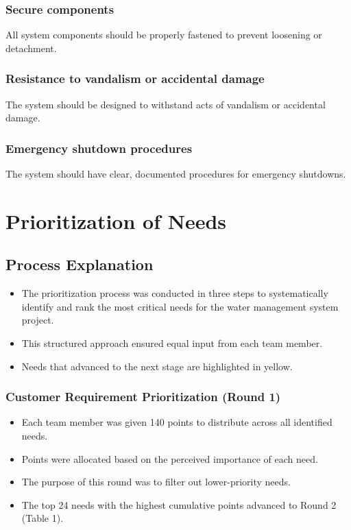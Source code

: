 \documentclass[12pt]{report}
\begin{document}
\subsubsection{Secure components}
All system components should be properly fastened to prevent loosening or detachment.

\subsubsection{Resistance to vandalism or accidental damage}
The system should be designed to withstand acts of vandalism or accidental damage.

\subsubsection{Emergency shutdown procedures}
The system should have clear, documented procedures for emergency shutdowns.

\newpage
\section{Prioritization of Needs}

\subsection{Process Explanation}
\begin{itemize}
    \item The prioritization process was conducted in three steps to systematically identify and rank the most critical needs for the water management system project.
    \item This structured approach ensured equal input from each team member.
    \item Needs that advanced to the next stage are highlighted in yellow.
\end{itemize}

\subsubsection{Customer Requirement Prioritization (Round 1)}
\begin{itemize}
    \item Each team member was given 140 points to distribute across all identified needs.
    \item Points were allocated based on the perceived importance of each need.
    \item The purpose of this round was to filter out lower-priority needs.
    \item The top 24 needs with the highest cumulative points advanced to Round 2 (Table 1).
\end{itemize}
\end{document}
